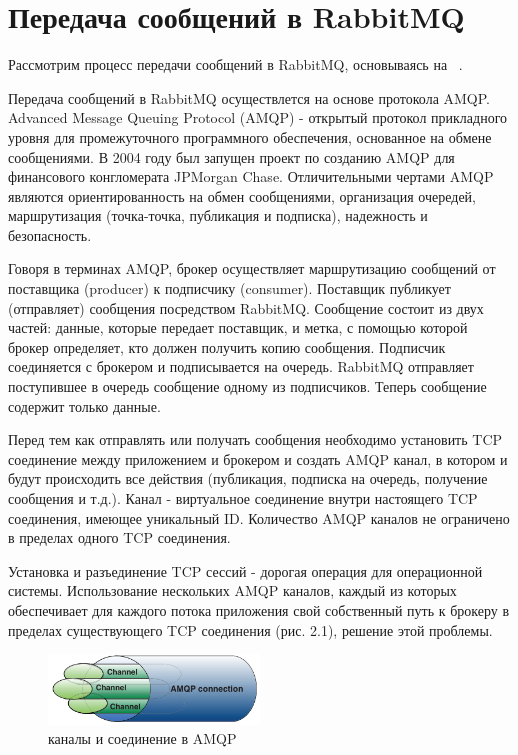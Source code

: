 \section{Передача сообщений в RabbitMQ} %
Рассмотрим процесс передачи сообщений в RabbitMQ, основываясь на ~\cite{rabbitmq_in_action}.\par
Передача сообщений в RabbitMQ осуществлется на основе протокола AMQP. Advanced Message Queuing Protocol (AMQP) - открытый протокол прикладного уровня для промежуточного программного обеспечения, основанное на обмене сообщениями. В 2004 году был запущен проект по созданию AMQP для финансового конгломерата JPMorgan Chase. Отличительными чертами AMQP являются ориентированность на обмен сообщениями, организация очередей, маршрутизация (точка-точка, публикация и подписка), надежность и безопасность. \par
Говоря в терминах AMQP, брокер осуществляет маршрутизацию сообщений от поставщика (producer) к подписчику (consumer). Поставщик публикует (отправляет) сообщения посредством RabbitMQ. Сообщение состоит из двух частей: данные, которые передает поставщик, и метка, с помощью которой брокер определяет, кто должен получить копию сообщения. Подписчик соединяется с брокером и подписывается на очередь. RabbitMQ отправляет поступившее в очередь сообщение одному из подписчиков. Теперь сообщение содержит только данные.\par
Перед тем как отправлять или получать сообщения необходимо установить TCP соединение между приложением и брокером и создать AMQP канал, в котором и будут происходить все действия (публикация, подписка на очередь, получение сообщения и т.д.). Канал - виртуальное соединение внутри настоящего TCP соединения, имеющее уникальный ID. Количество AMQP каналов не ограничено в пределах одного TCP соединения.\par 
Установка и разъединение TCP сессий - дорогая операция для операционной системы. Использование нескольких AMQP каналов, каждый из которых обеспечивает  для каждого потока приложения свой собственный путь к брокеру в пределах существующего TCP соединения (рис. 2.1), решение этой проблемы.\par
\begin{figure}
\centering
\includegraphics[width=0.5\textwidth]{img/channels.png}
\caption{каналы и соединение в AMQP}
\end{figure}
